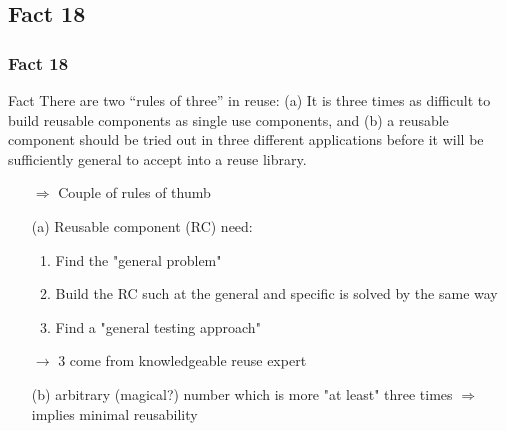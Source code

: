 \documentclass{beamer}
\begin{document}
\subsection{Fact 18}
\begin{frame}
    \frametitle{Fact 18}
    \begin{block}{Fact}
    There are two \enquote{rules of three} in reuse: (a) It is three times as
    difficult to build reusable components as single use components, and (b) a
    reusable component should be tried out in three different applications
    before it will be sufficiently general to accept into a reuse library.
    \end{block}

    \begin{itemize}
        \item[$\Rightarrow$] Couple of rules of thumb

        \item[(a)] Reusable component (RC) need: 
            \begin{enumerate}
                \item Find the "general problem"
                \item Build the RC such at the general and specific is
                    solved by the same way
                \item Find a "general testing approach"
            \end{enumerate}

            $\rightarrow$  3 come from knowledgeable reuse expert

        \item[(b)] arbitrary (magical?) number which is more "at
            least" three times $\Rightarrow$ implies minimal reusability 
    \end{itemize}
\end{frame}
\end{document}

